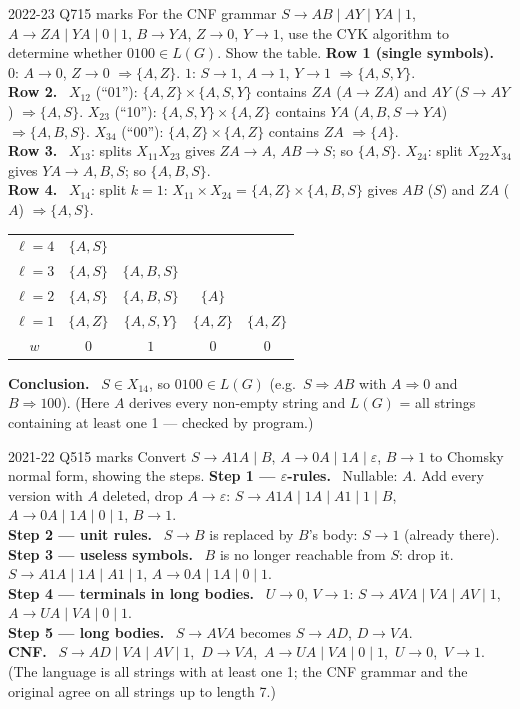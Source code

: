 \documentclass[10.5pt,a4paper]{article}
\newcommand{\ansh}[1]{\textbf{\color{exborder}#1}\ }
\newcommand{\eps}{\varepsilon}
\begin{document}
\begin{examq}{2022-23 Q7}{15 marks}
For the CNF grammar $S\to AB\mid AY\mid YA\mid1$, $A\to ZA\mid YA\mid0\mid1$, $B\to YA$, $Z\to0$, $Y\to1$, use the CYK algorithm to determine
whether $0100\in L(G)$. Show the table.
\tcblower
\ansh{Row 1 (single symbols).} $0$: $A\to0$, $Z\to0$ $\Rightarrow\{A,Z\}$. $1$: $S\to1$, $A\to1$, $Y\to1$ $\Rightarrow\{A,S,Y\}$.\\
\ansh{Row 2.} $X_{12}$ (``01''): $\{A,Z\}\times\{A,S,Y\}$ contains $ZA$ ($A\to ZA$) and $AY$ ($S\to AY$) $\Rightarrow\{A,S\}$.
$X_{23}$ (``10''): $\{A,S,Y\}\times\{A,Z\}$ contains $YA$ ($A,B,S\to YA$) $\Rightarrow\{A,B,S\}$.
$X_{34}$ (``00''): $\{A,Z\}\times\{A,Z\}$ contains $ZA$ $\Rightarrow\{A\}$.\\
\ansh{Row 3.} $X_{13}$: splits $X_{11}X_{23}$ gives $ZA\to A$, $AB\to S$; so $\{A,S\}$. $X_{24}$: split $X_{22}X_{34}$ gives $YA\to A,B,S$; so $\{A,B,S\}$.\\
\ansh{Row 4.} $X_{14}$: split $k=1$: $X_{11}\times X_{24}=\{A,Z\}\times\{A,B,S\}$ gives $AB$ ($S$) and $ZA$ ($A$) $\Rightarrow\{A,S\}$.
\begin{center}\small
\begin{tabular}{c|cccc}
$\ell=4$ & $\{A,S\}$ & & & \\
$\ell=3$ & $\{A,S\}$ & $\{A,B,S\}$ & & \\
$\ell=2$ & $\{A,S\}$ & $\{A,B,S\}$ & $\{A\}$ & \\
$\ell=1$ & $\{A,Z\}$ & $\{A,S,Y\}$ & $\{A,Z\}$ & $\{A,Z\}$\\\hline
$w$ & $0$ & $1$ & $0$ & $0$
\end{tabular}
\end{center}
\ansh{Conclusion.} $S\in X_{14}$, so $0100\in L(G)$ (e.g.\ $S\Rightarrow AB$ with $A\Rightarrow0$ and $B\Rightarrow100$).
(Here $A$ derives every non-empty string and $L(G)$ = all strings containing at least one 1 --- checked by program.)
\end{examq}

\begin{examq}{2021-22 Q5}{15 marks}
Convert $S\to A1A\mid B$, $A\to0A\mid1A\mid\eps$, $B\to1$ to Chomsky normal form, showing the steps.
\tcblower
\ansh{Step 1 --- $\eps$-rules.} Nullable: $A$. Add every version with $A$ deleted, drop $A\to\eps$:
$S\to A1A\mid1A\mid A1\mid1\mid B$, $A\to0A\mid1A\mid0\mid1$, $B\to1$.\\
\ansh{Step 2 --- unit rules.} $S\to B$ is replaced by $B$'s body: $S\to1$ (already there).\\
\ansh{Step 3 --- useless symbols.} $B$ is no longer reachable from $S$: drop it.
$S\to A1A\mid1A\mid A1\mid1$, $A\to0A\mid1A\mid0\mid1$.\\
\ansh{Step 4 --- terminals in long bodies.} $U\to0$, $V\to1$: $S\to AVA\mid VA\mid AV\mid1$, $A\to UA\mid VA\mid0\mid1$.\\
\ansh{Step 5 --- long bodies.} $S\to AVA$ becomes $S\to AD$, $D\to VA$.\\
\ansh{CNF.} $S\to AD\mid VA\mid AV\mid1$,\ $D\to VA$,\ $A\to UA\mid VA\mid0\mid1$,\ $U\to0$,\ $V\to1$.
(The language is all strings with at least one 1; the CNF grammar and the original agree on all strings up to length 7.)
\end{examq}
\end{document}
